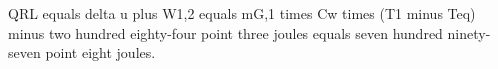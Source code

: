 QRL equals delta u plus W1,2 equals mG,1 times Cw times (T1 minus Teq) minus two hundred eighty-four point three joules equals seven hundred ninety-seven point eight joules.
